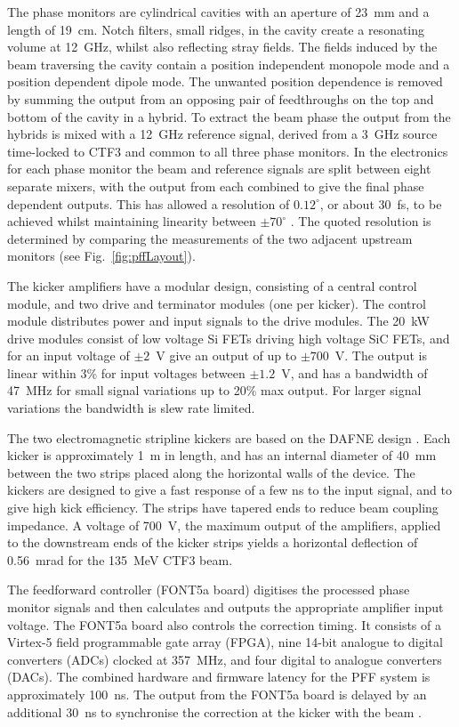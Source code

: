 \documentclass[%
 reprint,
superscriptaddress,
 amsmath,amssymb,
 prl,
]{revtex4-1}
\begin{document}
The phase monitors \cite{phMonEuCard} are cylindrical cavities with an aperture 
of 23~mm and a length of 19~cm. Notch filters, small ridges, in the cavity 
create a resonating volume at 12~GHz, whilst also reflecting stray fields.
The fields induced by the beam traversing the cavity contain a position 
independent monopole mode and a position dependent dipole mode. The unwanted 
position dependence is removed by summing the output from an opposing pair 
of feedthroughs on the top and bottom of the cavity in a hybrid. 
To extract the beam phase the output from the hybrids 
is mixed with a 12~GHz reference signal, derived from a 3~GHz source 
time-locked to CTF3 and common to all three phase monitors.
In the electronics for each phase monitor the beam and reference signals are 
split between eight separate mixers, with the output from each combined to give 
the final phase dependent outputs. This has allowed a resolution of 
\(0.12^\circ\), or about 30~fs, to be achieved whilst maintaining linearity 
between \(\pm70^\circ\) \cite{RobertsThesis}. The quoted resolution 
is determined by comparing the measurements of the two adjacent upstream 
monitors (see Fig.~\ref{fig:pffLayout}).

The kicker amplifiers \cite{RobertsThesis} have a modular design, 
consisting of a central control module, and two drive and terminator modules 
(one per kicker). The control module distributes power and input signals to the 
drive modules. The 20~kW drive modules consist of low voltage Si FETs driving 
high voltage SiC FETs, and for an input voltage of \(\pm2\)~V give an output of 
up to \(\pm700\)~V. The output is linear within 3\% for input voltages between 
\(\pm1.2\)~V, and has a bandwidth of 47~MHz for small signal variations up to 
20\% max output. For larger signal variations the bandwidth is slew rate 
limited.

The two electromagnetic stripline kickers \cite{kickerIPAC11} are based on the 
DAFNE design \cite{dafnePAC09}. Each kicker is approximately 1~m in length, and 
has an internal diameter of 40~mm between the two strips placed along the 
horizontal walls of the device. The kickers are designed to give a fast 
response of a few ns to the input signal, and to give high kick efficiency. The 
strips have tapered ends to reduce beam coupling impedance.
A voltage of 700~V, the maximum output of the amplifiers, applied to the 
downstream ends of the kicker strips yields a horizontal deflection of 
0.56~mrad for the 135~MeV CTF3 beam.

The feedforward controller (FONT5a board) \cite{RobertsThesis} digitises the 
processed phase monitor 
signals and then calculates and outputs the appropriate amplifier input 
voltage. The FONT5a board also controls the correction timing. It consists of a 
Virtex-5 field programmable gate array (FPGA), nine 14-bit analogue to digital 
converters (ADCs) clocked at 357~MHz, and four digital to analogue converters 
(DACs). The combined hardware and firmware latency for the PFF system is 
approximately 100~ns. The output from the FONT5a board is delayed by an 
additional 30~ns to synchronise the correction at the kicker with the beam 
\cite{RobertsThesis}.
\end{document}
